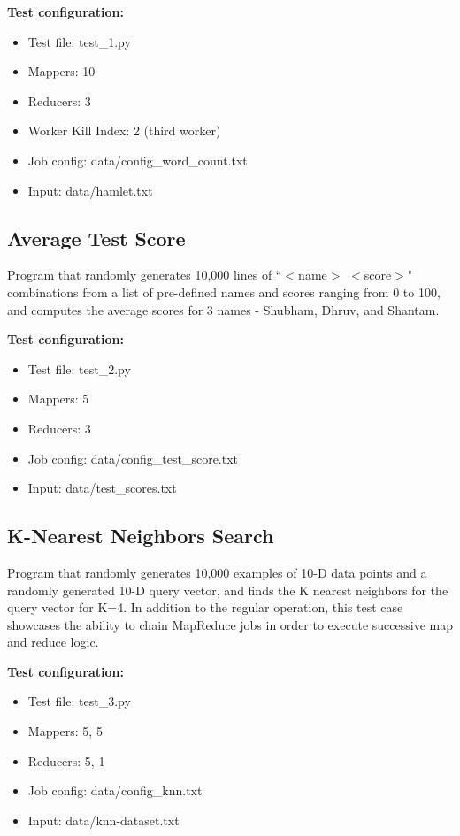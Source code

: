 \documentclass[a4paper,12pt]{article}
\begin{document}
\textbf{Test configuration:}
\begin{itemize}
    \item Test file: test\_1.py
    \item Mappers: 10
    \item Reducers: 3
    \item Worker Kill Index: 2 (third worker)
    \item Job config: data/config\_word\_count.txt
    \item Input: data/hamlet.txt
\end{itemize}

\subsection{Average Test Score}
Program that randomly generates 10,000 lines of ``$<$name$>$ $<$score$>$" combinations from a list of pre-defined names and scores ranging from 0 to 100, and computes the average scores for 3 names - Shubham, Dhruv, and Shantam. \newline

\textbf{Test configuration:}
\begin{itemize}
    \item Test file: test\_2.py
    \item Mappers: 5
    \item Reducers: 3
    \item Job config: data/config\_test\_score.txt
    \item Input: data/test\_scores.txt
\end{itemize}

\subsection{K-Nearest Neighbors Search}
Program that randomly generates 10,000 examples of 10-D data points and a randomly generated 10-D query vector, and finds the K nearest neighbors for the query vector for K=4. In addition to the regular operation, this test case showcases the ability to chain MapReduce jobs in order to execute successive map and reduce logic. \newline

\textbf{Test configuration:}
\begin{itemize}
    \item Test file: test\_3.py
    \item Mappers: 5, 5
    \item Reducers: 5, 1
    \item Job config: data/config\_knn.txt
    \item Input: data/knn-dataset.txt
\end{itemize}
\end{document}
